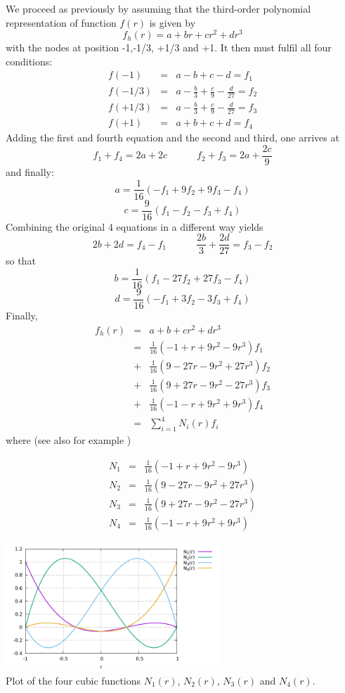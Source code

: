 We proceed as previously by assuming that the third-order 
polynomial representation of function $f(r)$ is given by
\[
f_h(r)=a+br+cr^2+dr^3
\]
with the nodes at position -1,-1/3, +1/3 and +1.
It then must fulfil all four conditions:
\begin{eqnarray}
f(-1)   &=& a-b+c-d = f_1 \nonumber\\
f(-1/3) &=& a-\frac{b}{3}+\frac{c}{9}-\frac{d}{27} = f_2 \nonumber\\
f(+1/3) &=& a-\frac{b}{3}+\frac{c}{9}-\frac{d}{27} = f_3 \nonumber\\
f(+1)   &=& a+b+c+d = f_4 \nonumber
\end{eqnarray}
Adding the first and fourth equation and the second and third, one arrives at
\[
f_1+f_4 = 2a+2c \quad\quad\quad f_2+f_3=2a+\frac{2c}{9}
\]
and finally:
\[
a=\frac{1}{16} \left( -f_1 + 9f_2 + 9f_3 - f_4  \right)
\]
\[
c=\frac{9}{16}\left(f_1-f_2-f_3+f_4\right)
\]
Combining the original 4 equations in a different way yields
\[
2b+2d=f_4-f_1 
\quad\quad\quad
\frac{2b}{3} + \frac{2d}{27} = f_3-f_2
\]
so that
\[
b=\frac{1}{16} \left( f_1 - 27f_2 + 27f_3 -f_4   \right)
\]
\[
d=\frac{9}{16} \left( -f_1 + 3f_2 - 3f_3 + f_4 \right)
\]
Finally,
\begin{eqnarray}
f_h(r) 
&=& a+b+cr^2+dr^3 \nonumber\\
&=& \frac{1}{16} (-1+  r +9r^2 - 9r^3 )f_1 \nonumber\\ 
&+& \frac{1}{16} ( 9-27r -9r^2 +27r^3 )f_2 \nonumber\\ 
&+& \frac{1}{16} ( 9+27r -9r^2 -27r^3 )f_3 \nonumber\\ 
&+& \frac{1}{16} (-1-  r +9r^2 + 9r^3 )f_4 \nonumber\\ 
&=& \sum_{i=1}^4 N_i(r) f_i \nonumber
\end{eqnarray}
where (see also for example \cite[p49]{li06})
\begin{mdframed}[backgroundcolor=blue!5]
\begin{eqnarray}
N_1&=& \frac{1}{16} (-1+  r+9r^2- 9r^3 ) \nonumber\\ 
N_2&=& \frac{1}{16} ( 9-27r-9r^2+27r^3 ) \nonumber\\ 
N_3&=& \frac{1}{16} ( 9+27r-9r^2-27r^3 ) \nonumber\\ 
N_4&=& \frac{1}{16} (-1-  r+9r^2+ 9r^3 ) \nonumber
\end{eqnarray}
\end{mdframed}

\begin{center}
\includegraphics[width=8cm]{images/basis1D/cubic.pdf}\\
{\captionfont Plot of the four cubic functions $N_1(r)$, $N_2(r)$, $N_3(r)$ and $N_4(r)$.}
\end{center}

